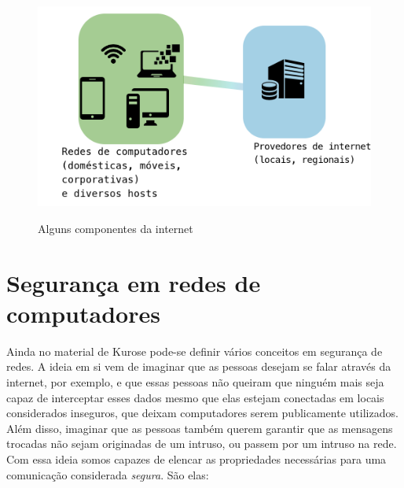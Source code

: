 \begin{figure}[H]
\caption{\small Alguns componentes da internet}
\centering
\includegraphics[scale=0.5]{figs/fig3_teste.png}
\label{f.internet_01}
\end{figure}

\section{Segurança em redes de computadores}
\label{s.seguranca}

Ainda no material de Kurose pode-se definir vários conceitos em segurança de
redes. A ideia em si vem de imaginar que as pessoas desejam se falar através da
internet, por exemplo, e que essas pessoas não queiram que ninguém mais seja
capaz de interceptar esses dados mesmo que elas estejam conectadas em locais
considerados inseguros, que deixam computadores serem publicamente utilizados.
Além disso, imaginar que as pessoas também querem garantir que as mensagens
trocadas não sejam originadas de um intruso, ou passem por um intruso na rede.
Com essa ideia somos capazes de elencar as propriedades necessárias para uma
comunicação considerada \emph{segura}. São elas:

